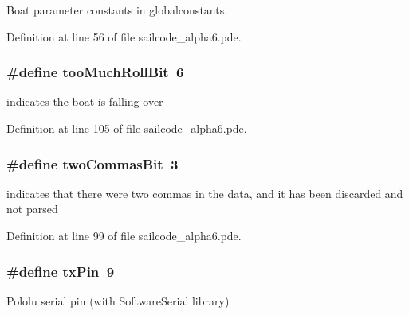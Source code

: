 \-Boat parameter constants in globalconstants. 



\-Definition at line 56 of file sailcode\-\_\-alpha6.\-pde.

\hypertarget{group__globalconstants_ga808c40e80d82d52b2ceab81282ad35ec}{
\subsubsection[{too\-Much\-Roll\-Bit}]{\setlength{\rightskip}{0pt plus 5cm}\#define too\-Much\-Roll\-Bit~6}}
\label{group__globalconstants_ga808c40e80d82d52b2ceab81282ad35ec}


indicates the boat is falling over 



\-Definition at line 105 of file sailcode\-\_\-alpha6.\-pde.

\hypertarget{group__globalconstants_gae059b25098726f37143284774ef86a07}{
\subsubsection[{two\-Commas\-Bit}]{\setlength{\rightskip}{0pt plus 5cm}\#define two\-Commas\-Bit~3}}
\label{group__globalconstants_gae059b25098726f37143284774ef86a07}


indicates that there were two commas in the data, and it has been discarded and not parsed 



\-Definition at line 99 of file sailcode\-\_\-alpha6.\-pde.

\hypertarget{group__globalconstants_ga38340aff22e726c77f9cf87b5bea10dd}{
\subsubsection[{tx\-Pin}]{\setlength{\rightskip}{0pt plus 5cm}\#define tx\-Pin~9}}
\label{group__globalconstants_ga38340aff22e726c77f9cf87b5bea10dd}


\-Pololu serial pin (with \-Software\-Serial library) 



